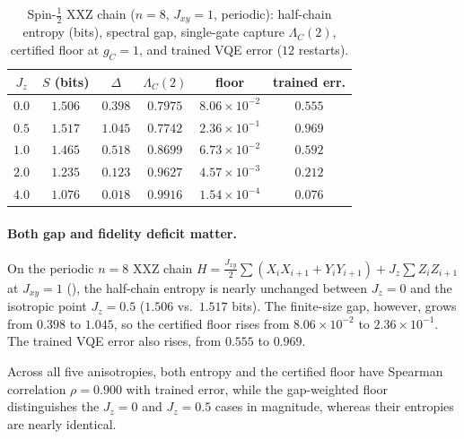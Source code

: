 \documentclass[reprint,aps,pra,floatfix,superscriptaddress,nofootinbib,longbibliography]{revtex4-2}
\theoremstyle{remark}
\theoremstyle{definition}
\begin{document}
\begin{table}[t]
\centering
\caption{Spin-$\tfrac12$ XXZ chain ($n=8$, $J_{xy}=1$, periodic): half-chain entropy (bits),
spectral gap, single-gate capture $\Lambda_C(2)$, certified floor at $g_C=1$, and
trained VQE error ($12$ restarts).}
\label{tab:xxz}
{\small\setlength{\tabcolsep}{6pt}
\begin{tabular}{cccccc}
\toprule
$J_z$ & $S$ (bits) & $\Delta$ & $\Lambda_C(2)$ & floor & trained err.\\
\midrule
$0.0$ & $1.506$ & $0.398$ & $0.7975$ & $8.06\times10^{-2}$ & $0.555$\\
$0.5$ & $1.517$ & $1.045$ & $0.7742$ & $2.36\times10^{-1}$ & $0.969$\\
$1.0$ & $1.465$ & $0.518$ & $0.8699$ & $6.73\times10^{-2}$ & $0.592$\\
$2.0$ & $1.235$ & $0.123$ & $0.9627$ & $4.57\times10^{-3}$ & $0.212$\\
$4.0$ & $1.076$ & $0.018$ & $0.9916$ & $1.54\times10^{-4}$ & $0.076$\\
\bottomrule
\end{tabular}}
\end{table}

\paragraph{Both gap and fidelity deficit matter.}
On the periodic $n=8$ XXZ chain
$H=\tfrac{J_{xy}}{2}\sum(X_iX_{i+1}+Y_iY_{i+1})+J_z\sum Z_iZ_{i+1}$ at $J_{xy}=1$
(), the half-chain entropy is nearly unchanged between $J_z=0$
and the isotropic point $J_z=0.5$ ($1.506$ vs.\ $1.517$ bits). The finite-size
gap, however, grows from $0.398$ to $1.045$, so the certified floor rises from
$8.06\times10^{-2}$ to $2.36\times10^{-1}$. The trained VQE error also rises,
from $0.555$ to $0.969$.

Across all five
anisotropies, both entropy and the certified floor have Spearman correlation
$\rho=0.900$ with trained error, while the gap-weighted floor distinguishes the $J_z=0$ and $J_z=0.5$ cases in
magnitude, whereas their entropies are nearly identical.

\twocolumngrid


\end{document}
